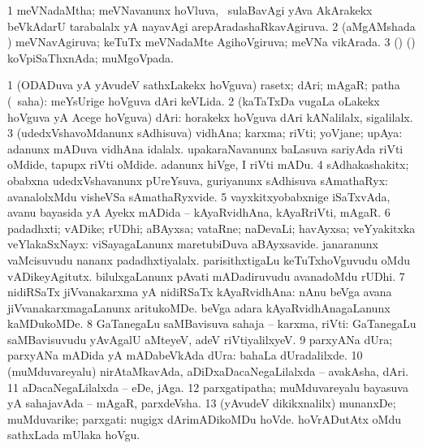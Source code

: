 \bentry
{} 
\gl{\gu}
\bmng
\bnum
\num{1} meVNadaMtha; meVNavanunx hoVluva, \kanmu\ sulaBavAgi yAva AkArakekx beVkAdarU tarabalalx yA nayavAgi arepAradashaRkavAgiruva. 
\num{2} (aMgAMshada \vi) meVNavAgiruva; keTuTx meVNadaMte AgihoVgiruva; meVNa vikArada. 
\num{3} (\birx) (\ashi) koVpiSaThxnAda; muMgoVpada. 
\enum
\emng
\eentry

\bentry
{} 
\gl{\nA}
\expl{}
\bmng
\bnum
\num{1} (ODADuva yA yAvudeV sathxLakekx hoVguva) rasetx; dAri; mAgaR; patha (\rUpa\ saha):  meYsUrige hoVguva dAri keVLida. 
\num{2} (kaTaTxDa \mo vugaLa oLakekx hoVguva yA Acege hoVguva) dAri:  horakekx hoVguva dAri kANalilalx, sigalilalx. 
\num{3} (udedxVshavoMdanunx sAdhisuva) vidhAna; karxma; riVti; yoVjane; upAya:  adanunx mADuva vidhAna idalalx.  upakaraNavanunx baLasuva sariyAda riVti oMdide, tapupx riVti oMdide.  adanunx hiVge, I riVti mADu. 
\num{4} sAdhakashakitx; obabxna udedxVshavanunx pUreYsuva, guriyanunx sAdhisuva sAmathaRyx:  avanalolxMdu visheVSa sAmathaRyxvide. 
\num{5} vayxkitxyobabxnige iSaTxvAda, avanu bayasida yA Ayekx mADida -- kAyaRvidhAna, kAyaRriVti, mAgaR. 
\num{6} padadhxti; vADike; rUDhi; aBAyxsa; vataRne; naDevaLi; havAyxsa; veYyakitxka veYlakaSxNayx:  viSayagaLanunx maretubiDuva aBAyxsavide.  janaranunx vaMcisuvudu nananx padadhxtiyalalx.  parisithxtigaLu keTuTxhoVguvudu oMdu vADikeyAgitutx.  bilulxgaLanunx pAvati mADadiruvudu avanadoMdu rUDhi. 
\num{7} nidiRSaTx jiVvanakarxma yA nidiRSaTx kAyaRvidhAna:  nAnu beVga avana jiVvanakarxmagaLanunx aritukoMDe.  beVga adara kAyaRvidhAnagaLanunx kaMDukoMDe. 
\num{8} GaTanegaLu saMBavisuva sahaja -- karxma, riVti:  GaTanegaLu saMBavisuvudu yAvAgalU aMteyeV, adeV riVtiyalilxyeV. 
\num{9} parxyANa dUra; parxyANa mADida yA mADabeVkAda dUra:  bahaLa dUradalilxde. 
\num{10} (muMduvareyalu) nirAtaMkavAda, aDiDxaDacaNegaLilalxda -- avakAsha, dAri. 
\num{11} aDacaNegaLilalxda -- eDe, jAga. 
\num{12} parxgatipatha; muMduvareyalu bayasuva yA sahajavAda -- mAgaR, parxdeVsha. 
\num{13} (yAvudeV dikikxnalilx) munanxDe; muMduvarike; parxgati:  nugigx dArimADikoMDu hoVde.  hoVrADutAtx oMdu sathxLada mUlaka hoVgu. 
